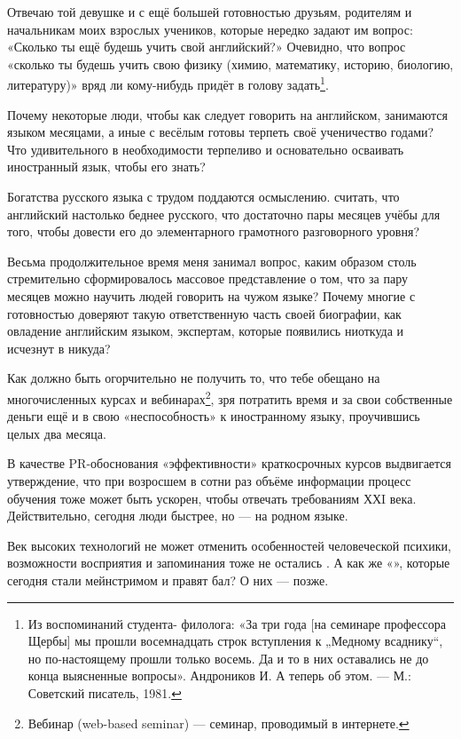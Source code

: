 Отвечаю той девушке и с ещё большей готовностью друзьям, родителям и начальникам моих взрослых учеников, которые нередко задают им вопрос: «Сколько ты ещё будешь учить свой английский?» Очевидно, что вопрос «сколько ты будешь учить свою физику (химию, математику, историю, биологию, литературу)» вряд ли кому-нибудь придёт в голову задать\footnote{
Из воспоминаний студента- филолога: «За три года [на семинаре профессора Щербы] мы прошли восемнадцать строк вступления к „Медному всаднику“, но по-настоящему прошли только восемь. Да и то в них оставались не до конца выясненные вопросы». Андроников И. А теперь об этом. --- М.: Советский писатель, 1981.}.

Почему некоторые люди, чтобы как следует говорить на английском,  занимаются языком месяцами, а иные с весёлым  готовы терпеть своё ученичество годами? Что удивительного в необходимости терпеливо и основательно осваивать иностранный язык, чтобы его знать?

Богатства русского языка с трудом поддаются осмыслению.  считать, что английский настолько беднее русского, что достаточно пары месяцев учёбы для того, чтобы довести его до элементарного грамотного разговорного уровня?

Весьма продолжительное время меня занимал вопрос, каким образом столь стремительно сформировалось массовое представление о том, что за пару месяцев можно научить людей говорить на чужом языке? Почему многие с готовностью доверяют такую ответственную часть своей биографии, как овладение английским языком,  экспертам, которые появились ниоткуда и исчезнут в никуда?

Как должно быть огорчительно не получить то, что тебе обещано на многочисленных курсах и вебинарах\footnote{Вебинар (web-based seminar) --- семинар, проводимый в интернете.}, зря потратить время и за свои собственные деньги ещё и  в свою «неспособность» к иностранному языку, проучившись целых два месяца.

В качестве PR-обоснования «эффективности» краткосрочных курсов выдвигается утверждение, что при возросшем в сотни раз объёме информации процесс обучения тоже может быть ускорен, чтобы отвечать требованиям ХХI века. Действительно, сегодня люди  быстрее, но ---  на родном языке.

Век высоких технологий не может отменить особенностей человеческой психики, возможности восприятия и запоминания тоже не остались . А как же «», которые сегодня стали мейнстримом и правят бал? О них --- позже.

